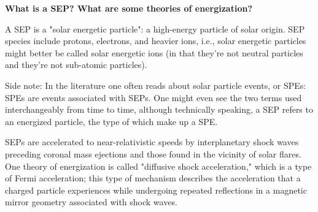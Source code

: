 \textbf{What is a SEP? What are some theories of energization?}

A SEP is a "solar energetic particle": a high-energy particle of solar
origin. SEP species include protons, electrons, and heavier ions, i.e.,
solar energetic particles might better be called solar energetic ions
(in that they're not neutral particles and they're not sub-atomic
particles). 

Side note: In the literature one often reads about solar particle events, or SPEs:
SPEs are events associated with SEPs. One might even see the two terms
used interchangeably from time to time, although technically speaking, a
SEP refers to an energized particle, the type of which make up a SPE.

SEPs are accelerated to near-relativistic speeds by interplanetary shock
waves preceding coronal mass ejections and those found in the vicinity
of solar flares. One theory of energization is called "diffusive shock
acceleration," which is a type of Fermi acceleration; this type of
mechanism describes the acceleration that a charged particle experiences
while undergoing repeated reflections in a magnetic mirror geometry
associated with shock waves.


